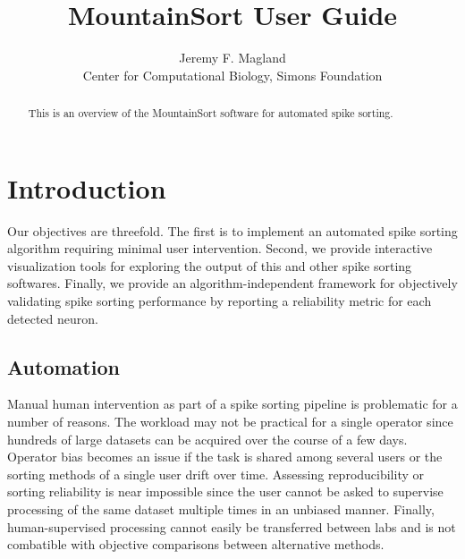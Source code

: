 \documentclass[hidelinks,10pt]{article}
\begin{document}
\def\spacingset#1{\renewcommand{\baselinestretch}%
{#1}\small\normalsize} \spacingset{1}



\title{\bf MountainSort User Guide}
\author{Jeremy F. Magland\hspace{.2cm}\\
  Center for Computational Biology, Simons Foundation\\
  }
\maketitle

\bigskip
\begin{abstract}
This is an overview of the MountainSort software for automated spike sorting.
\end{abstract}

\vfill

\newpage

\section {Introduction}

Our objectives are threefold. The first is to implement an automated spike sorting algorithm requiring minimal user intervention. Second, we provide interactive visualization tools for exploring the output of this and other spike sorting softwares. Finally, we provide an algorithm-independent framework for objectively validating spike sorting performance by reporting a reliability metric for each detected neuron.

\subsection {Automation}

Manual human intervention as part of a spike sorting pipeline is problematic for a number of reasons. The workload may not be practical for a single operator since hundreds of large datasets can be acquired over the course of a few days. Operator bias becomes an issue if the task is shared among several users or the sorting methods of a single user drift over time. Assessing reproducibility or sorting reliability is near impossible since the user cannot be asked to supervise processing of the same dataset multiple times in an unbiased manner. Finally, human-supervised processing cannot easily be transferred between labs and is not combatible with objective comparisons between alternative methods. 
\end{document}
